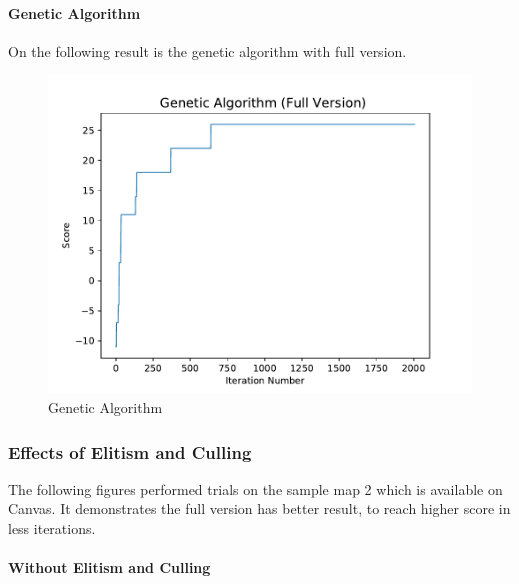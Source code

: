 \documentclass[11pt, a4paper]{article}
\begin{document}
\paragraph{Genetic Algorithm}

On the following result is the genetic algorithm with full version.


\begin{figure}[htbp]
	\centering 
	\includegraphics[scale=0.5]{up3_3}
	\caption{Genetic Algorithm} %
\end{figure}

\subsubsection{Effects of Elitism and Culling}

The following figures performed trials on the sample map 2 which is available on Canvas. It demonstrates the full version has better result, to reach higher score in less iterations.


\paragraph{Without Elitism and Culling}
\end{document}
